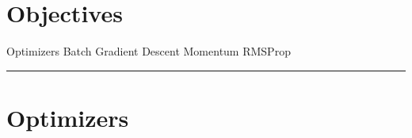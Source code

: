
\section*{Objectives}
\begin{outline}
    \1 Optimizers
    \1 Batch Gradient Descent
    \1 Momentum
    \1 RMSProp
\end{outline}

\rule[0.0051in]{\textwidth}{0.00025in}
\section{Optimizers}
